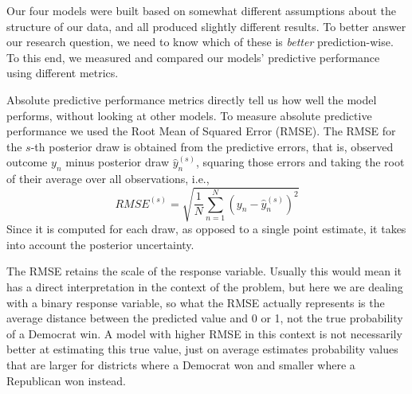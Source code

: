 \documentclass[12pt]{article}
\newcommand{\blue}[1]{\textcolor{blue}{#1}}
\begin{document}
Our four models were built based on somewhat different assumptions about the structure of our data, and all produced slightly different results. To better answer our research question, we need to know which of these is \textit{better} prediction-wise.
To this end, we measured and compared our models' predictive performance using different metrics. %


Absolute predictive performance metrics directly tell us how well the model performs, without looking at other models.
To measure absolute predictive performance we used the Root Mean of Squared Error (RMSE). The RMSE for the $s$-th posterior draw is obtained from the predictive errors, that is, observed outcome $y_n$ minus posterior draw $\hat{y}_n^{(s)}$, squaring those errors and taking the root of their average over all observations, i.e.,
$$
RMSE^{(s)} = \sqrt{
	\frac{1}{N} 
	\sum_{n = 1}^{N}
	\left( y_n - \hat{y}_n^{(s)} \right)^2
}
$$
Since it is computed for each draw, as opposed to a single point estimate, it takes into account the posterior uncertainty.



The RMSE retains the scale of the response variable.
Usually this would mean it has a direct interpretation in the context of the problem, but here we are dealing with a binary response variable, so what the RMSE actually represents is the average distance between the predicted value and 0 or 1, not the true probability of a Democrat win.
A model with higher RMSE in this context is not necessarily better at estimating this true value, just on average estimates probability values that are larger for districts where a Democrat won and smaller where a Republican won instead. 
\end{document}
